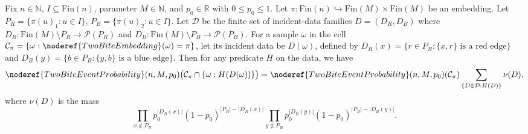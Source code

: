 \begin{helper}
Fix $n\in\mathbb N$, $I\subseteq\mathrm{Fin}(n)$, parameter $M\in\mathbb N$, and $p_0\in\mathbb R$ with $0\le p_0\le1$.
Let $\pi:\mathrm{Fin}(n)\hookrightarrow\mathrm{Fin}(M)\times\mathrm{Fin}(M)$ be an embedding.
Let $P_R=\{\pi(u)_1:u\in I\}$, $P_B=\{\pi(u)_2:u\in I\}$.
Let $\mathcal D$ be the finite set of incident-data families $D=(D_R, D_B)$ where $D_R:\mathrm{Fin}(M)\setminus P_R\to\mathcal{P}(P_R)$ and $D_B:\mathrm{Fin}(M)\setminus P_B\to\mathcal{P}(P_B)$.
For a sample $\omega$ in the cell $\mathcal C_\pi = \{\omega:\noderef{TwoBiteEmbedding}(\omega)=\pi\}$, let its incident data be $D(\omega)$, defined by $D_R(x)=\{r\in P_R:\{x,r\}\text{ is a red edge}\}$ and $D_B(y)=\{b\in P_B:\{y,b\}\text{ is a blue edge}\}$.
Then for any predicate $H$ on the data, we have
\[
\noderef{TwoBiteEventProbability}(n,M,p_0)
 \bigl(\mathcal C_\pi\cap \{\omega:H(D(\omega))\}\bigr)
=
\noderef{TwoBiteEventProbability}(n,M,p_0)(\mathcal C_\pi)
\sum_{\{D\in\mathcal D: H(D)\}} \nu(D),
\]
where $\nu(D)$ is the mass
\[
\prod_{x\notin P_R} p_0^{|D_R(x)|}(1-p_0)^{|P_R|-|D_R(x)|} \prod_{y\notin P_B} p_0^{|D_B(y)|}(1-p_0)^{|P_B|-|D_B(y)|}.
\]
\end{helper}
